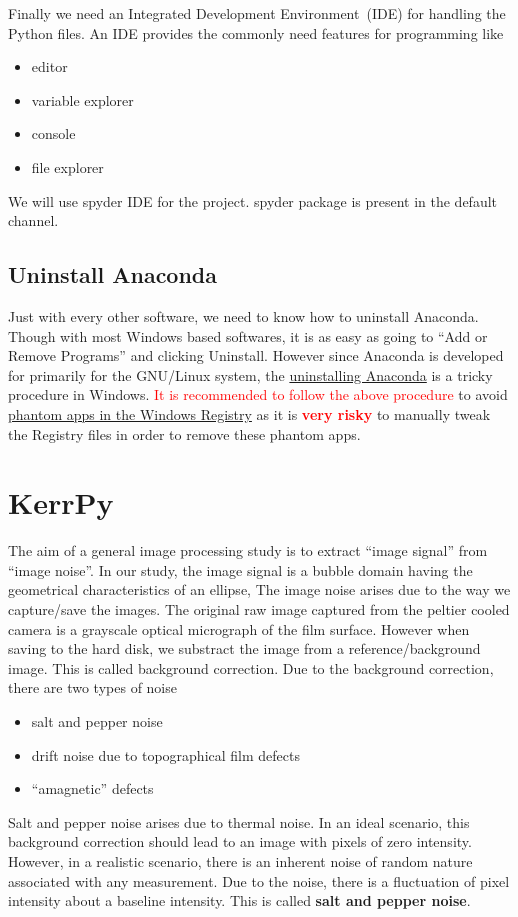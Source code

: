 \documentclass[12pt, twoside, a4paper]{article}
\begin{document}
Finally we need an Integrated Development Environment~(IDE) for handling the Python files. An IDE provides the commonly need features for programming like
\begin{itemize}
	\item editor
	\item variable explorer
	\item console
	\item file explorer 
\end{itemize}
We will use spyder IDE for the project. spyder package is present in the default channel.
%
\subsection{Uninstall Anaconda}
Just with every other software, we need to know how to uninstall Anaconda. Though with most Windows based softwares, it is as easy as going to ``Add or Remove Programs'' and clicking Uninstall. However since Anaconda is developed for primarily for the GNU/Linux system, the \href{https://docs.anaconda.com/anaconda/install/uninstall/#}{uninstalling Anaconda} is a tricky procedure in Windows. \textcolor{red}{It is recommended to follow the above procedure} to avoid \href{https://www.howtogeek.com/314734/how-to-manually-remove-programs-from-the-windows-uninstall-program-list/}{phantom apps in the Windows Registry} as it is \textcolor{red}{\textbf{very risky}} to manually tweak the Registry files in order to remove these phantom apps.

\section{KerrPy}
The aim of a general image processing study is to extract ``image signal'' from ``image noise''. In our study, the image signal is a bubble domain having the geometrical characteristics of an ellipse, The image noise arises due to the way we capture/save the images.  The original raw image captured from the peltier cooled camera is a grayscale optical micrograph of the film surface. However when saving to the hard disk, we substract the image from a reference/background image. This is called background correction. Due to the background correction, there are two types of noise
%
\begin{itemize}
	\item salt and pepper noise
	\item drift noise due to topographical film defects
	\item ``amagnetic'' defects
\end{itemize}
%
Salt and pepper noise arises due to thermal noise. In an ideal scenario, this background correction should lead to an image with pixels of zero intensity. However, in a realistic scenario, there is an inherent noise of random nature associated with any measurement. Due to the noise, there is a fluctuation of pixel intensity about a baseline intensity. This is called \textbf{salt and pepper noise}. 
\end{document}
